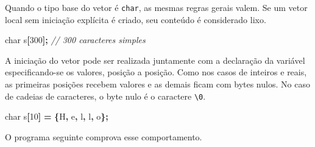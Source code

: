 \documentclass[
  11pt,
  a4paper,
]{scrbook}
\newenvironment{Shaded}{\begin{snugshade}}{\end{snugshade}}
\newcommand{\CharTok}[1]{\textcolor[rgb]{0.31,0.60,0.02}{#1}}
\newcommand{\CommentTok}[1]{\textcolor[rgb]{0.56,0.35,0.01}{\textit{#1}}}
\newcommand{\DataTypeTok}[1]{\textcolor[rgb]{0.13,0.29,0.53}{#1}}
\newcommand{\DecValTok}[1]{\textcolor[rgb]{0.00,0.00,0.81}{#1}}
\newcommand{\NormalTok}[1]{#1}
\newcommand{\OperatorTok}[1]{\textcolor[rgb]{0.81,0.36,0.00}{\textbf{#1}}}
\begin{document}
Quando o tipo base do vetor é \texttt{char}, as mesmas regras gerais
valem. Se um vetor local sem iniciação explícita é criado, seu conteúdo
é considerado lixo.

\begin{Shaded}
\begin{Highlighting}[]
\DataTypeTok{char}\NormalTok{ s}\OperatorTok{[}\DecValTok{300}\OperatorTok{];}  \CommentTok{// 300 caracteres simples}
\end{Highlighting}
\end{Shaded}

A iniciação do vetor pode ser realizada juntamente com a declaração da
variável especificando-se os valores, posição a posição. Como nos casos
de inteiros e reais, as primeiras posições recebem valores e as demais
ficam com bytes nulos. No caso de cadeias de caracteres, o byte nulo é o
caractere \texttt{\textbackslash{}0}.

\begin{Shaded}
\begin{Highlighting}[]
\DataTypeTok{char}\NormalTok{ s}\OperatorTok{[}\DecValTok{10}\OperatorTok{]} \OperatorTok{=} \OperatorTok{\{}\CharTok{\textquotesingle{}H\textquotesingle{}}\OperatorTok{,} \CharTok{\textquotesingle{}e\textquotesingle{}}\OperatorTok{,} \CharTok{\textquotesingle{}l\textquotesingle{}}\OperatorTok{,} \CharTok{\textquotesingle{}l\textquotesingle{}}\OperatorTok{,} \CharTok{\textquotesingle{}o\textquotesingle{}}\OperatorTok{\};}
\end{Highlighting}
\end{Shaded}

O programa seguinte comprova esse comportamento.
\end{document}
